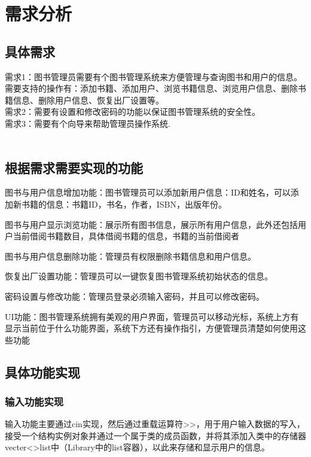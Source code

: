 \documentclass{article}
\begin{document}
\section{需求分析}

\subsection{具体需求}

需求1：图书管理员需要有个图书管理系统来方便管理与查询图书和用户的信息。需要支持的操作有：添加书籍、添加用户、浏览书籍信息、浏览用户信息、删除书籍信息、删除用户信息、恢复出厂设置等。\\
需求2：需要有设置和修改密码的功能以保证图书管理系统的安全性。\\
需求3：需要有个向导来帮助管理员操作系统.\\\\

\subsection{根据需求需要实现的功能}
图书与用户信息增加功能：图书管理员可以添加新用户信息：ID和姓名，可以添加新书籍的信息：书籍ID，书名，作者，ISBN，出版年份。

图书与用户显示浏览功能：展示所有图书信息，展示所有用户信息，此外还包括用户当前借阅书籍数目，具体借阅书籍的信息，书籍的当前借阅者

图书与用户信息删除功能：管理员有权限删除书籍信息和用户信息。

恢复出厂设置功能：管理员可以一键恢复图书管理系统初始状态的信息。

密码设置与修改功能：管理员登录必须输入密码，并且可以修改密码。

UI功能：图书管理系统拥有美观的用户界面，管理员可以移动光标，系统上方有显示当前位于什么功能界面，系统下方还有操作指引，方便管理员清楚如何使用这些功能\\
\subsection{具体功能实现}
\subsubsection{输入功能实现}
输入功能主要通过cin实现，然后通过重载运算符>>，用于用户输入数据的写入，接受一个结构实例对象并通过一个属于类的成员函数，并将其添加入类中的存储器vecter<>list中（Library中的list容器），以此来存储和显示用户的信息。\\
\end{document}
